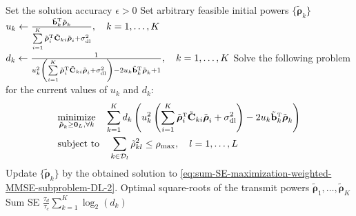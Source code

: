 \begin{algorithm}
	\caption{Block coordinate descent algorithm for solving the sum SE maximization problem in \eqref{eq:sum-SE-maximization-downlink-2}.} \label{alg:sum-SE-downlink-2}
	\begin{algorithmic}[1]
		 Set the solution accuracy $\epsilon>0$
		\State Set arbitrary feasible initial powers $\{\tilde{\boldsymbol{\rho}}_k\}$
		\State $u_{k} \gets \frac{\tilde{\vect{b}}_k^{\Ttran}\tilde{\boldsymbol{\rho}}_k}{\sum\limits_{i=1}^K\tilde{\boldsymbol{\rho}}_i^{\Ttran}\tilde{\vect{C}}_{ki}\tilde{\boldsymbol{\rho}}_i+\sigmaDL}, \quad k=1,\ldots,K$
		\State $d_k \gets \frac{1}{u_{k}^2\left(\sum\limits_{i=1}^K\tilde{\boldsymbol{\rho}}_i^{\Ttran}\tilde{\vect{C}}_{ki}\tilde{\boldsymbol{\rho}}_i+\sigmaDL\right) -2u_{k}\tilde{\vect{b}}_k^{\Ttran}\tilde{\boldsymbol{\rho}}_k+1}, \quad k=1,\ldots,K$
		\State Solve the following problem for the current values of  $u_k$ and $d_k$:
		\begin{align}
		&\underset{\tilde{\boldsymbol{\rho}}_k \geq \vect{0}_L, \forall k}{\textrm{minimize}} \quad \sum_{k=1}^Kd_{k}\left(u_{k}^2\left(\sum\limits_{i=1}^K\tilde{\boldsymbol{\rho}}_i^{\Ttran}\tilde{\vect{C}}_{ki}\tilde{\boldsymbol{\rho}}_i+\sigmaDL\right) -2u_{k}\tilde{\vect{b}}_k^{\Ttran}\tilde{\boldsymbol{\rho}}_k\right) \label{eq:sum-SE-maximization-weighted-MMSE-subproblem-DL-2} \\
		&\hspace{0cm}\textrm{subject to} \quad \sum_{k\in \mathcal{D}_l}\tilde{\rho}_{kl}^2\leq \rhomax, \quad l=1,\ldots,L    \nonumber
		\end{align}
		\State Update $\{\tilde{\boldsymbol{\rho}}_k\}$ by the obtained solution to \eqref{eq:sum-SE-maximization-weighted-MMSE-subproblem-DL-2}.
		\EndWhile
		 Optimal square-roots of the transmit powers $\tilde{\boldsymbol{\rho}}_1,\ldots,\tilde{\boldsymbol{\rho}}_K$
		\State Sum SE $\frac{\tau_d}{\tau_c}\sum_{k=1}^K\log_2\left(d_k\right)$
	\end{algorithmic}
\end{algorithm}



